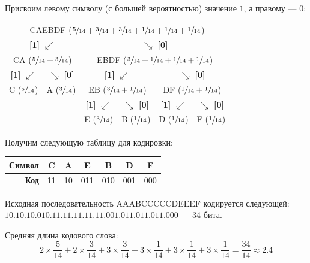 \begin{example}
    Присвоим левому символу (с большей вероятностью) значение $1$, а правому --- $0$:

    \begin{table}[H]
        \centering
        \begin{tabular}{cccccc}
            \multicolumn{6}{c}{CAEBDF ($\sfrac{5}{14} + \sfrac{3}{14} + \sfrac{3}{14} + \sfrac{1}{14} + \sfrac{1}{14} + \sfrac{1}{14}$)} \\
            \multicolumn{2}{c}{\textbf{[1]} $\swarrow$} & \multicolumn{4}{c}{$\searrow$ \textbf{[0]}} \\
            \multicolumn{2}{c}{CA ($\sfrac{5}{14} + \sfrac{3}{14}$)} & \multicolumn{4}{c}{EBDF ($\sfrac{3}{14} + \sfrac{1}{14} + \sfrac{1}{14} + \sfrac{1}{14}$)} \\
            \textbf{[1]} $\swarrow$ & $\searrow$ \textbf{[0]} & \multicolumn{2}{c}{\textbf{[1]} $\swarrow$} & \multicolumn{2}{c}{$\searrow$ \textbf{[0]}} \\
            C ($\sfrac{5}{14}$) & A ($\sfrac{3}{14}$) & \multicolumn{2}{c}{EB ($\sfrac{3}{14} + \sfrac{1}{14}$)} & \multicolumn{2}{c}{DF ($\sfrac{1}{14} + \sfrac{1}{14}$)} \\
            & & \textbf{[1]} $\swarrow$ & $\searrow$ \textbf{[0]} & \textbf{[1]} $\swarrow$ & $\searrow$ \textbf{[0]} \\
            & & E ($\sfrac{3}{14}$) & B ($\sfrac{1}{14}$) & D ($\sfrac{1}{14}$) & F ($\sfrac{1}{14}$) \\
        \end{tabular}
    \end{table}

    Получим следующую таблицу для кодировки:
    \nopagebreak[4]
    \begin{table}[H]
        \centering
        \begin{tabular}{|r|c|c|c|c|c|c|}
            \hline
            \textbf{Символ} & C & A & E & B & D & F \\ \hline
            \textbf{Код} & 11 & 10 & 011 & 010 & 001 & 000 \\ \hline
        \end{tabular}
    \end{table}

    \answer%
    Исходная последовательность AAABCCCCCDEEEF кодируется следующей: $10.10.10.010.11.11.11.11.11.001.011.011.011.000$ --- 34 бита.

    Средняя длина кодового слова:
    \[
        2 \times \frac{5}{14} + 2 \times \frac{3}{14} + 3 \times \frac{3}{14} + 3 \times \frac{1}{14} + 3 \times \frac{1}{14} + 3 \times \frac{1}{14}  = \frac{34}{14} \approx \num{2.4}
    \]
\end{example}
